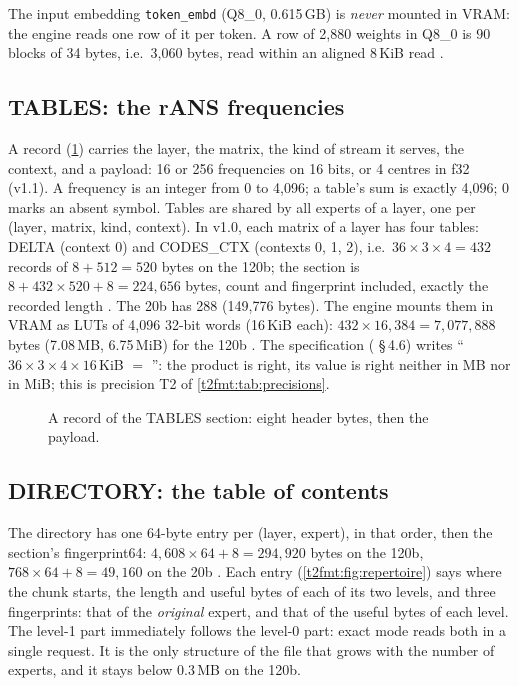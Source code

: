 The input embedding \texttt{token\_embd} (Q8\_0, 0.615\,GB) is \emph{never} mounted in VRAM: the engine reads one row of it per token. A row of 2{,}880 weights in Q8\_0 is $90$ blocks of 34 bytes, i.e.\ 3{,}060 bytes, read within an aligned 8\,KiB read \calc.

\subsection{TABLES: the rANS frequencies}

A record (\cref{t2fmt:fig:table}) carries the layer, the matrix, the kind of stream it serves, the context, and a payload: 16 or 256 frequencies on 16 bits, or 4 centres in f32 (v1.1). A frequency is an integer from 0 to 4{,}096; a table's sum is exactly 4{,}096; 0 marks an absent symbol. Tables are shared by all experts of a layer, one per (layer, matrix, kind, context). In v1.0, each matrix of a layer has four tables: DELTA (context 0) and CODES\_CTX (contexts 0, 1, 2), i.e.\ $36 \times 3 \times 4 = 432$ records of $8 + 512 = 520$ bytes on the 120b; the section is $8 + 432 \times 520 + 8 = 224{,}656$ bytes, count and fingerprint included, exactly the recorded length \calc. The 20b has 288 (149{,}776 bytes). The engine mounts them in VRAM as LUTs of 4{,}096 32-bit words (16\,KiB each): $432 \times 16{,}384 = 7{,}077{,}888$ bytes (7.08\,MB, 6.75\,MiB) for the 120b \calc. The specification ( §\,4.6) writes ``$36 \times 3 \times 4 \times 16$\,KiB $=$ '': the product is right, its value is right neither in MB nor in MiB; this is precision T2 of \cref{t2fmt:tab:precisions}.

\begin{figure}[ht]
\centering
\TdFmtTable
\caption[A record of the TABLES section]{A record of the TABLES section: eight header bytes, then the payload.}
\label{t2fmt:fig:table}
\end{figure}

\subsection{DIRECTORY: the table of contents}

The directory has one 64-byte entry per (layer, expert), in that order, then the section's fingerprint64: $4{,}608 \times 64 + 8 = 294{,}920$ bytes on the 120b, $768 \times 64 + 8 = 49{,}160$ on the 20b \calc. Each entry (\cref{t2fmt:fig:repertoire}) says where the chunk starts, the length and useful bytes of each of its two levels, and three fingerprints: that of the \emph{original} expert, and that of the useful bytes of each level. The level-1 part immediately follows the level-0 part: exact mode reads both in a single request. It is the only structure of the file that grows with the number of experts, and it stays below 0.3\,MB on the 120b.

